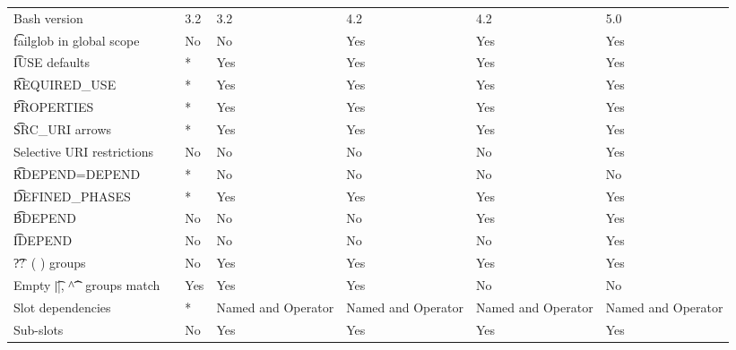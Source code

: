 \begin{landscape}
\begin{longtable}{llP{7.5em}P{7.5em}P{7.5em}P{7.5em}P{7.5em}}
Bash version &  &
    3.2 & 3.2 & 4.2 & 4.2 & 5.0 \\

\t{failglob} in global scope &  &
    No & No & Yes & Yes & Yes \\

\t{IUSE} defaults &  &
    * & Yes & Yes & Yes & Yes \\

\t{REQUIRED_USE} &  &
    * & Yes & Yes & Yes & Yes \\

\t{PROPERTIES} &  &
    * & Yes & Yes & Yes & Yes \\

\t{SRC_URI} arrows &  &
    * & Yes & Yes & Yes & Yes \\

Selective URI restrictions &  &
    No & No & No & No & Yes \\

\t{RDEPEND=DEPEND} &  &
    * & No & No & No & No \\

\t{DEFINED_PHASES} &  &
    * & Yes & Yes & Yes & Yes \\

\t{BDEPEND} &  &
    No & No & No & Yes & Yes \\

\t{IDEPEND} &  &
    No & No & No & No & Yes \\

\t{??\ ( )} groups &  &
    No & Yes & Yes & Yes & Yes \\

Empty \t{||}, \t{\textasciicircum\textasciicircum} groups match &
     &
    Yes & Yes & Yes & No & No \\

Slot dependencies &  &
    * & Named and Operator & Named and Operator & Named and Operator & Named and Operator \\

Sub-slots &  &
    No & Yes & Yes & Yes & Yes \\


\end{longtable}
\end{landscape}
